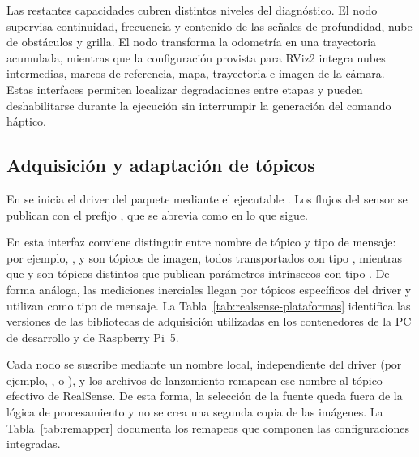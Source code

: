 Las restantes capacidades cubren distintos niveles del diagnóstico. El nodo
 supervisa continuidad, frecuencia y contenido de las señales de
profundidad, nube de obstáculos y grilla. El nodo  transforma la odometría en
una trayectoria acumulada, mientras que la configuración provista para RViz2 integra nubes
intermedias, marcos de referencia, mapa, trayectoria e imagen de la cámara. Estas interfaces
permiten localizar degradaciones entre etapas y pueden deshabilitarse durante la ejecución sin
interrumpir la generación del comando háptico.

\subsection{Adquisición y adaptación de tópicos}
\label{sec:arq-sensor}

En  se inicia el driver del paquete 
mediante el ejecutable . Los flujos del sensor se publican
con el prefijo , que se abrevia como  en lo que sigue.

En esta interfaz conviene distinguir entre nombre de tópico y tipo de mensaje: por
ejemplo, ,  y
 son tópicos de imagen, todos transportados con
tipo , mientras que  y
 son tópicos distintos que publican parámetros intrínsecos con tipo
. De forma análoga, las mediciones inerciales llegan por tópicos
específicos del driver y utilizan  como tipo de mensaje.
La Tabla~\ref{tab:realsense-plataformas} identifica las versiones de las bibliotecas de adquisición
utilizadas en los contenedores de la PC de desarrollo y de Raspberry Pi~5.

Cada nodo se suscribe mediante un nombre local, independiente del driver (por ejemplo,
,  o ), y los archivos de lanzamiento remapean ese
nombre al tópico efectivo de RealSense. De esta forma, la selección de la fuente queda fuera de la
lógica de procesamiento y no se crea una segunda copia de las imágenes. La
Tabla~\ref{tab:remapper} documenta los remapeos que componen las configuraciones integradas.

